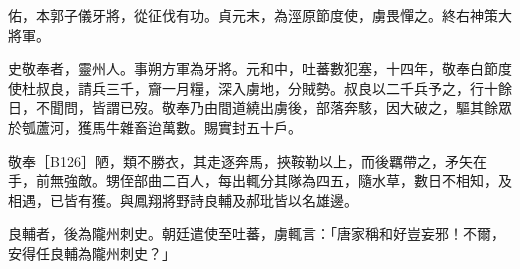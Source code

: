 \begin{pinyinscope}
 佑，本郭子儀牙將，從征伐有功。貞元末，為涇原節度使，虜畏憚之。終右神策大將軍。



 史敬奉者，靈州人。事朔方軍為牙將。元和中，吐蕃數犯塞，十四年，敬奉白節度使杜叔良，請兵三千，齎一月糧，深入虜地，分賊勢。叔良以二千兵予之，行十餘日，不聞問，皆謂已歿。敬奉乃由間道繞出虜後，部落奔駭，因大破之，驅其餘眾於瓠蘆河，獲馬牛雜畜迨萬數。賜實封五十戶。



 敬奉［B126］陋，類不勝衣，其走逐奔馬，挾鞍勒以上，而後羈帶之，矛矢在手，前無強敵。甥侄部曲二百人，每出輒分其隊為四五，隨水草，數日不相知，及相遇，已皆有獲。與鳳翔將野詩良輔及郝玭皆以名雄邊。



 良輔者，後為隴州刺史。朝廷遣使至吐蕃，虜輒言：「唐家稱和好豈妄邪！不爾，安得任良輔為隴州刺史？」



\end{pinyinscope}